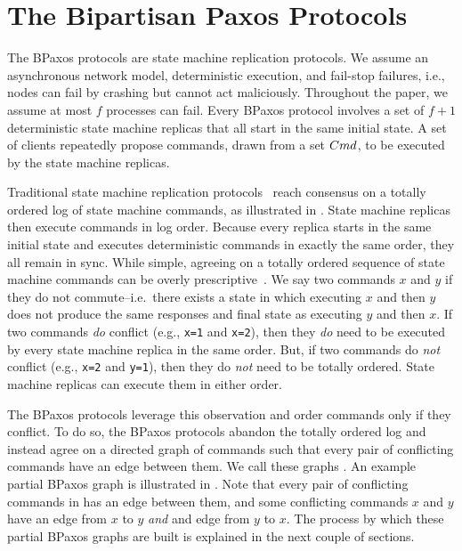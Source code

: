 \section{The Bipartisan Paxos Protocols}
The BPaxos protocols are state machine replication protocols. We assume an
asynchronous network model, deterministic execution, and fail-stop failures,
i.e., nodes can fail by crashing but cannot act maliciously. Throughout the
paper, we assume at most $f$ processes can fail. Every BPaxos protocol involves
a set of $f + 1$ deterministic state machine replicas that all start in the
same initial state. A set of clients repeatedly propose commands, drawn from a
set $Cmd$, to be executed by the state machine replicas.



Traditional state machine replication protocols~\cite{liskov2012viewstamped,
lamport1998part} reach consensus on a totally ordered log of state machine
commands, as illustrated in . State machine replicas then
execute commands in log order. Because every replica starts in the same initial
state and executes deterministic commands in exactly the same order,
they all remain in sync.
%
While simple, agreeing on a totally ordered sequence of state machine commands
can be overly prescriptive~\cite{lamport2005generalized, moraru2013there}. We
say two commands $x$ and $y$  if they do not commute--i.e.\
there exists a state in which executing $x$ and then $y$ does not produce the
same responses and final state as executing $y$ and then $x$. If two commands
\emph{do} conflict (e.g., \texttt{x=1} and \texttt{x=2}), then they \emph{do}
need to be executed by every state machine replica in the same order.  But, if
two commands do \emph{not} conflict (e.g., \texttt{x=2} and \texttt{y=1}), then
they do \emph{not} need to be totally ordered. State machine replicas can
execute them in either order.

The BPaxos protocols leverage this observation and order commands only if they
conflict. To do so, the BPaxos protocols abandon the totally ordered log and
instead agree on a directed graph of commands such that every pair of
conflicting commands have an edge between them. We call these graphs
\defword{partial BPaxos graphs}. An example partial BPaxos graph is illustrated
in . Note that every pair of conflicting commands in
\figref{BPaxosSMR} has an edge between them, and some conflicting commands $x$
and $y$ have an edge from $x$ to $y$ \emph{and} and edge from $y$ to $x$. The
process by which these partial BPaxos graphs are built is explained in the next
couple of sections.

